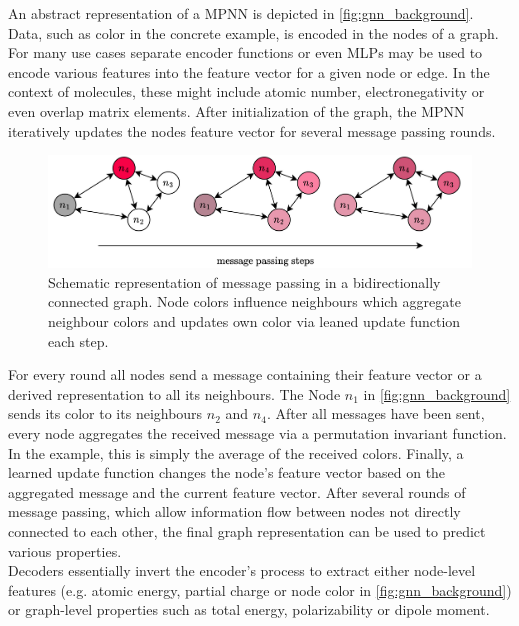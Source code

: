 An abstract representation of a MPNN is depicted in \autoref{fig:gnn_background}. Data, such as color in the concrete example, is encoded in the nodes of a graph. For many use cases separate encoder functions or even MLPs may be used to encode various features into the feature vector for a given node or edge. In the context of molecules, these might include atomic number, electronegativity or even overlap matrix elements. After initialization of the graph, the MPNN iteratively updates the nodes feature vector for several message passing rounds. 
\begin{figure}[h]
    \centering
    \includegraphics[width=\textwidth]{../fig/background/GNN.pdf}
    \caption[Schematic Message Passing Neural Net]{Schematic representation of message passing in a bidirectionally connected graph. Node colors influence neighbours which aggregate neighbour colors and updates own color via leaned update function each step.}
    \label{fig:gnn_background}
\end{figure}
For every round all nodes send a message containing their feature vector or a derived representation to all its neighbours. The Node $n_1$ in \autoref{fig:gnn_background} sends its color to its neighbours $n_2$ and $n_4$. After all messages have been sent, every node aggregates the received message via a permutation invariant function. In the example, this is simply the average of the received colors. Finally, a learned update function changes the node's feature vector based on the aggregated message and the current feature vector. After several rounds of message passing, which allow information flow between nodes not directly connected to each other, the final graph representation can be used to predict various properties.\\
Decoders essentially invert the encoder's process to extract either node-level features (e.g. atomic energy, partial charge or node color in \autoref{fig:gnn_background}) or graph-level properties such as total energy, polarizability or dipole moment.\\

